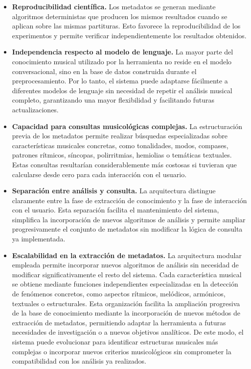 \begin{itemize}
\item \textbf{Reproducibilidad científica.} Los metadatos se generan mediante algoritmos deterministas que producen los mismos resultados cuando se aplican sobre las mismas partituras. Esto favorece la reproducibilidad de los experimentos y permite verificar independientemente los resultados obtenidos.
\item \textbf{Independencia respecto al modelo de lenguaje.} La mayor parte del conocimiento musical utilizado por la herramienta no reside en el modelo conversacional, sino en la base de datos construida durante el preprocesamiento. Por lo tanto, el sistema puede adaptarse fácilmente a diferentes modelos de lenguaje sin necesidad de repetir el análisis musical completo, garantizando una mayor flexibilidad y facilitando futuras actualizaciones.
\item \textbf{Capacidad para consultas musicológicas complejas.} La estructuración previa de los metadatos permite realizar búsquedas especializadas sobre características musicales concretas, como tonalidades, modos, compases, patrones rítmicos, síncopas, polirritmias, hemiolias o temáticas textuales. Estas consultas resultarían considerablemente más costosas si tuvieran que calcularse desde cero para cada interacción con el usuario.
\item \textbf{Separación entre análisis y consulta.} La arquitectura distingue claramente entre la fase de extracción de conocimiento y la fase de interacción con el usuario. Esta separación facilita el mantenimiento del sistema, simplifica la incorporación de nuevos algoritmos de análisis y permite ampliar progresivamente el conjunto de metadatos sin modificar la lógica de consulta ya implementada.
\item \textbf{Escalabilidad en la extracción de metadatos.} La arquitectura modular empleada permite incorporar nuevos algoritmos de análisis sin necesidad de modificar significativamente el resto del sistema. Cada característica musical se obtiene mediante funciones independientes especializadas en la detección de fenómenos concretos, como aspectos rítmicos, melódicos, armónicos, textuales o estructurales. Esta organización facilita la ampliación progresiva de la base de conocimiento mediante la incorporación de nuevos métodos de extracción de metadatos, permitiendo adaptar la herramienta a futuras necesidades de investigación o a nuevos objetivos analíticos. De este modo, el sistema puede evolucionar para identificar estructuras musicales más complejas o incorporar nuevos criterios musicológicos sin comprometer la compatibilidad con los análisis ya realizados.
\end{itemize}

